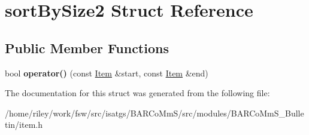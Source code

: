 \hypertarget{structsort_by_size2}{}\section{sort\+By\+Size2 Struct Reference}
\label{structsort_by_size2}
\subsection*{Public Member Functions}
\begin{DoxyCompactItemize}
\item 
bool {\bfseries operator()} (const \hyperlink{class_item}{Item} \&start, const \hyperlink{class_item}{Item} \&end)\hypertarget{structsort_by_size2_ae81846c497c001b7a155a4497b221859}{}\label{structsort_by_size2_ae81846c497c001b7a155a4497b221859}

\end{DoxyCompactItemize}


The documentation for this struct was generated from the following file\+:\begin{DoxyCompactItemize}
\item 
/home/riley/work/fsw/src/isatgs/\+B\+A\+R\+Co\+Mm\+S/src/modules/\+B\+A\+R\+Co\+Mm\+S\+\_\+\+Bulletin/item.\+h\end{DoxyCompactItemize}
